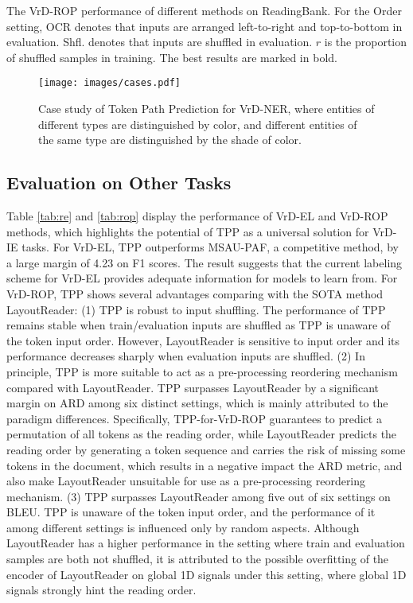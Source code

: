 \documentclass[11pt]{article}
\begin{document}
\begin{table}[t]
\begin{spacing}{1.19}
\end{spacing}
\caption{The VrD-ROP performance of different methods on ReadingBank.  
    For the Order setting, OCR denotes that inputs are arranged left-to-right and top-to-bottom in evaluation. Shfl. denotes that inputs are shuffled in evaluation. $r$ is the proportion of shuffled samples in training.
    The best results are marked in bold. 
    }
\vspace{-4mm}
\label{tab:rop}
\end{table}

\begin{figure*}[t]
    \centering
\texttt{[image: images/cases.pdf]}        
    \caption{
        Case study of Token Path Prediction for VrD-NER, where entities of different types are distinguished by color, and different entities of the same type are distinguished by the shade of color. 
        }
\label{fig:cases}
\end{figure*}

\subsection{Evaluation on Other Tasks}

Table \ref{tab:re} and \ref{tab:rop} display the performance of VrD-EL and VrD-ROP methods, which highlights the potential of TPP as a universal solution for VrD-IE tasks.
For VrD-EL, TPP outperforms MSAU-PAF, a competitive method, by a large margin of 4.23 on F1 scores. 
The result suggests that the current labeling scheme for VrD-EL provides adequate information for models to learn from.
For VrD-ROP, TPP shows several advantages comparing with the SOTA method LayoutReader:
(1) TPP is robust to input shuffling. The performance of TPP remains stable when train/evaluation inputs are shuffled as TPP is unaware of the token input order. 
However, LayoutReader is sensitive to input order and its performance decreases sharply when evaluation inputs are shuffled. 
(2) In principle, TPP is more suitable to act as a pre-processing reordering mechanism compared with LayoutReader. 
TPP surpasses LayoutReader by a significant margin on ARD among six distinct settings, which is mainly attributed to the paradigm differences. 
Specifically, TPP-for-VrD-ROP guarantees to predict a permutation of all tokens as the reading order, while LayoutReader predicts the reading order by generating a token sequence and carries the risk of missing some tokens in the document, which results in a negative impact the ARD metric, and also make LayoutReader unsuitable for use as a pre-processing reordering mechanism. 
(3) TPP surpasses LayoutReader among five out of six settings on BLEU. 
TPP is unaware of the token input order, and the performance of it among different settings is influenced only by random aspects. 
Although LayoutReader has a higher performance in the setting where train and evaluation samples are both not shuffled, it is attributed to the possible overfitting of the encoder of LayoutReader on global 1D signals under this setting, where global 1D signals strongly hint the reading order. 
\end{document}
